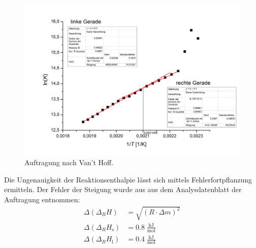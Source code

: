 \documentclass[12pt,a4paper,titlepage,headinclude,bibtotoc]{scrartcl}
\begin{document}
\FloatBarrier
\begin{figure}[h]
\includegraphics[width=13.5cm]{Van'tHoffAnalogzuEMK.png}
\caption{Auftragung nach Van't Hoff.}
\end{figure} 
\FloatBarrier
Die Ungenauigkeit der Reaktionsenthalpie lässt sich mittels Fehlerfortpflanzung ermitteln. Der Fehler der Steigung wurde aus aus dem Analysdatenblatt der Auftragung entnommen:
\begin{align}
\Delta(\Delta_R H) &= \sqrt{(R\cdot\Delta m)^2}\\
\Delta(\Delta_R H_{\text{s}}) &= 0.8\;\frac{\text{kJ}}{\text{mol}}\\
\Delta(\Delta_R H_{\text{l}}) &= 0.4\;\frac{\text{kJ}}{\text{mol}}
\end{align}
\end{document}
